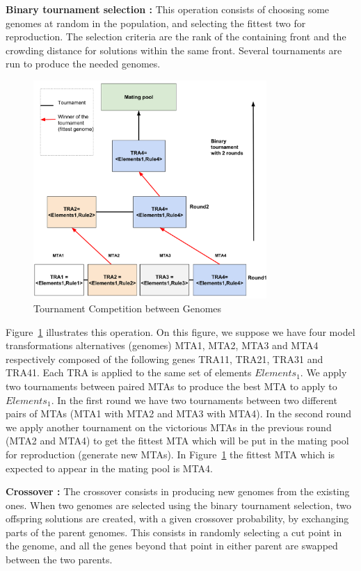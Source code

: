 \documentclass[conference]{IEEEtran}
\begin{document}
\textbf{Binary tournament selection :} 
This operation consists of choosing some genomes at random in the population, and selecting the fittest two for reproduction. The selection criteria are the rank of the containing front and the crowding distance for solutions within the same front. Several tournaments are run to produce the needed genomes.

\begin{figure}[!ht]
\centering
\includegraphics[width=3.49in]{bt.pdf}
\caption{Tournament Competition between Genomes}
\label{binary}
\end{figure}

Figure~\ref{binary} illustrates this operation. On this figure, we suppose we have four model transformations alternatives (genomes) MTA1, MTA2, MTA3 and MTA4 respectively composed of the following genes TRA11, TRA21, TRA31 and TRA41. Each TRA is applied to the same set of elements $Elements_{1}$.
We apply two tournaments between paired MTAs to produce the best MTA to apply to $Elements_{1}$. In the first round we have two tournaments between two different pairs of MTAs (MTA1 with MTA2 and MTA3 with MTA4). In the second round we apply another tournament on the victorious MTAs in the previous round (MTA2 and MTA4) to get the fittest MTA which will be put in the mating pool for reproduction (generate new MTAs). In Figure~\ref{binary} the fittest MTA which is expected to appear in the mating pool is MTA4.

\textbf{Crossover :} 
The crossover consists in producing new genomes from the existing ones. When two genomes are selected using the binary tournament selection, two offspring solutions are created, with a given crossover probability, by exchanging parts of the parent genomes. This consists in randomly selecting a cut point in the genome, and all the genes beyond that point in either parent are swapped between the two parents.
\end{document}
